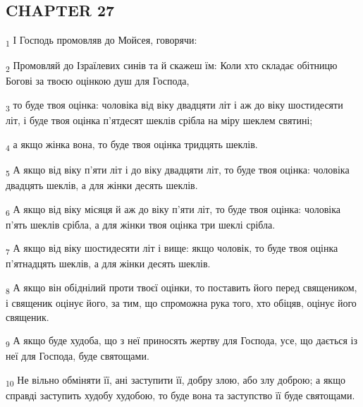\subsection{CHAPTER 27}
\begin{tcolorbox}
\textsubscript{1} І Господь промовляв до Мойсея, говорячи:
\end{tcolorbox}
\begin{tcolorbox}
\textsubscript{2} Промовляй до Ізраїлевих синів та й скажеш їм: Коли хто складає обітницю Богові за твоєю оцінкою душ для Господа,
\end{tcolorbox}
\begin{tcolorbox}
\textsubscript{3} то буде твоя оцінка: чоловіка від віку двадцяти літ і аж до віку шостидесяти літ, і буде твоя оцінка п'ятдесят шеклів срібла на міру шеклем святині;
\end{tcolorbox}
\begin{tcolorbox}
\textsubscript{4} а якщо жінка вона, то буде твоя оцінка тридцять шеклів.
\end{tcolorbox}
\begin{tcolorbox}
\textsubscript{5} А якщо від віку п'яти літ і до віку двадцяти літ, то буде твоя оцінка: чоловіка двадцять шеклів, а для жінки десять шеклів.
\end{tcolorbox}
\begin{tcolorbox}
\textsubscript{6} А якщо від віку місяця й аж до віку п'яти літ, то буде твоя оцінка: чоловіка п'ять шеклів срібла, а для жінки твоя оцінка три шеклі срібла.
\end{tcolorbox}
\begin{tcolorbox}
\textsubscript{7} А якщо від віку шостидесяти літ і вище: якщо чоловік, то буде твоя оцінка п'ятнадцять шеклів, а для жінки десять шеклів.
\end{tcolorbox}
\begin{tcolorbox}
\textsubscript{8} А якщо він обіднілий проти твоєї оцінки, то поставить його перед священиком, і священик оцінує його, за тим, що спроможна рука того, хто обіцяв, оцінує його священик.
\end{tcolorbox}
\begin{tcolorbox}
\textsubscript{9} А якщо буде худоба, що з неї приносять жертву для Господа, усе, що дається із неї для Господа, буде святощами.
\end{tcolorbox}
\begin{tcolorbox}
\textsubscript{10} Не вільно обміняти її, ані заступити її, добру злою, або злу доброю; а якщо справді заступить худобу худобою, то буде вона та заступство її буде святощами.
\end{tcolorbox}
